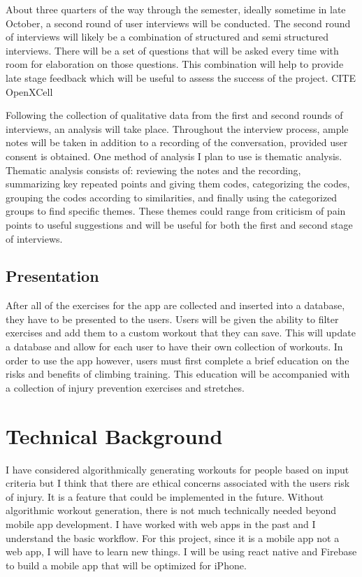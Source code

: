 \documentclass[10pt,twocolumn]{article}
\begin{document}
    About three quarters of the way through the semester, ideally sometime in late October, a second round of user interviews will be conducted. The second round of interviews will likely be a combination of structured and semi structured interviews. There will be a set of questions that will be asked every time with room for elaboration on those questions. This combination will help to provide late stage feedback which will be useful to assess the success of the project. CITE OpenXCell
    
    Following the collection of qualitative data from the first and second rounds of interviews, an analysis will take place. Throughout the interview process, ample notes will be taken in addition to a recording of the conversation, provided user consent is obtained. One method of analysis I plan to use is thematic analysis. Thematic analysis consists of: reviewing the notes and the recording, summarizing key repeated points and giving them codes, categorizing the codes, grouping the codes according to similarities, and finally using the categorized groups to find specific themes. These themes could range from criticism of pain points to useful suggestions and will be useful for both the first and second stage of interviews. \cite{christian_user_2021}
    
\subsection{Presentation}
    
    After all of the exercises for the app are collected and inserted into a database, they have to be presented to the users. Users will be given the ability to filter exercises and add them to a custom workout that they can save. This will update a database and allow for each user to have their own collection of workouts. In order to use the app however, users must first complete a brief education on the risks and benefits of climbing training. This education will be accompanied with a collection of injury prevention exercises and stretches.  
	
\section{Technical Background}

    I have considered algorithmically generating workouts for people based on input criteria but I think that there are ethical concerns associated with the users risk of injury. It is a feature that could be implemented in the future. Without algorithmic workout generation, there is not much technically needed beyond mobile app development. I have worked with web apps in the past and I understand the basic workflow. For this project, since it is a mobile app not a web app, I will have to learn new things. I will be using react native and Firebase to build a mobile app that will be optimized for iPhone.
\end{document}
